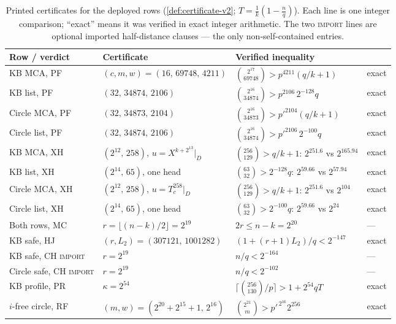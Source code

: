 \documentclass[11pt]{article}
\theoremstyle{definition}
\theoremstyle{remark}
\begin{document}
\begin{table}[ht]
\centering
\small
\begin{tabular}{@{}llll@{}}
\toprule
Row / verdict & Certificate & Verified inequality & \\
\midrule
KB MCA, PF & $(c,m,w)=(16,\,69748,\,4211)$ & $\binom{2^{17}}{69748}>p^{4211}(q/k+1)$ & exact \\
KB list, PF & $(32,\,34874,\,2106)$ & $\binom{2^{16}}{34874}>p^{2106}\,2^{-128}q$ & exact \\
Circle MCA, PF & $(32,\,34873,\,2104)$ & $\binom{2^{16}}{34873}>p'^{2104}(q/k+1)$ & exact \\
Circle list, PF & $(32,\,34874,\,2106)$ & $\binom{2^{16}}{34874}>p'^{2106}\,2^{-100}q$ & exact \\
KB MCA, XH & $(2^{12},\,258)$, $u=X^{k+2^{13}}|_D$ & $\binom{256}{129}>q/k+1$: $2^{251.6}$ vs $2^{165.94}$ & exact \\
KB list, XH & $(2^{14},\,65)$, one head & $\binom{63}{32}>2^{-128}q$: $2^{59.66}$ vs $2^{57.94}$ & exact \\
Circle MCA, XH & $(2^{12},\,258)$, $u=T_c^{258}|_D$ & $\binom{256}{129}>q/k+1$: $2^{251.6}$ vs $2^{104}$ & exact \\
Circle list, XH & $(2^{14},\,65)$, one head & $\binom{63}{32}>2^{-100}q$: $2^{59.66}$ vs $2^{24}$ & exact \\
Both rows, MC & $r=\lfloor(n-k)/2\rfloor=2^{19}$ & $2r\le n-k=2^{20}$ & --- \\
KB safe, HJ & $(r,L_2)=(307121,\,1001282)$ & $(1+(r+1)L_2)/q<2^{-147}$ & exact \\
KB safe, CH \textsc{import} & $r=2^{19}$ & $n/q<2^{-164}$ & --- \\
Circle safe, CH \textsc{import} & $r=2^{19}$ & $n/q<2^{-102}$ & --- \\
KB profile, PR & $\kappa=2^{54}$ & $\lceil\binom{256}{130}/p\rceil>1+2^{54}q T$ & exact \\
$i$-free circle, RF & $(m,w)=(2^{20}{+}2^{15}{+}1,\,2^{16})$ & $\binom{2^{21}}{m}>p'^{\,2^{16}}2^{256}$ & exact \\
\bottomrule
\end{tabular}
\caption{Printed certificates for the deployed rows (\cref{def:certificate-v2}; $T=\frac1k(1-\frac nq)$). Each line is one integer comparison; ``exact'' means it was verified in exact integer arithmetic. The two \textup{\textsc{import}} lines are optional imported half-distance clauses --- the only non-self-contained entries.}
\label{tab:certs}
\end{table}
\end{document}
